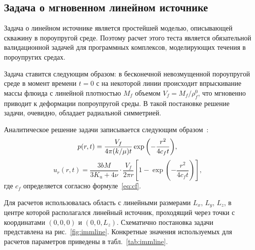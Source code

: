 
\subsection{Задача о мгновенном линейном источнике}
Задача о линейном источнике является простейшей моделью, описывающей скважину в пороупругой среде.
Поэтому расчет этого теста является обязательной валидационной задачей для программных комплексов,
моделирующих течения в пороупругих средах.

Задача ставится следующим образом: в бесконечной невозмущенной
пороупругой среде в момент времени $t=0$ с на некоторой линии
происходит впрыскивание массы флюида с линейной плотностью $M_f$
объемом $V_f = M_f/\rho^0_f$, что мгновенно приводит к деформации
попроупругой среды.  В такой постановке решение задачи, очевидно,
обладает радиальной симметрией.
 
Аналитическое решение задачи записывается следующим образом~\cite{coussy_2004}:
\begin{equation}
\label{eq:immlinep}
%
p(r,t) = \frac{V_f}{4\pi (k/\mu) t} \exp{\left( -\frac{r^2}{4 c_f t}\right)}, \\
%
\end{equation}
%
\begin{equation}
\label{eq:immlinur}
u_r(r,t) = \frac{3bM}{3K_u+4\nu} \cdot \frac{V_f}{2 \pi r} \left[1 - \exp{\left( -\frac{r^2}{4 c_f t}\right)} \right],
\end{equation}
%
%
%
где $c_f$ определяется согласно формуле~\eqref{eq:cf}.

Для расчетов использовалась область с линейными размерами $L_x$, $L_y$, $L_z$,
в центре которой располагался линейный источник,
проходящий через точки с координатами $(0, 0, 0)$ и $(0, 0, L_z)$.
Схематично постановка задачи представлена на рис.~\ref{fig:immline}.
Конкретные значения используемых для расчетов параметров приведены в табл.~\ref{tab:immline}.

